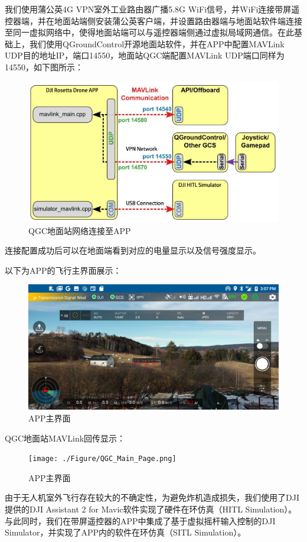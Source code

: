 我们使用蒲公英4G VPN室外工业路由器广播5.8G WiFi信号，并WiFi连接带屏遥控器端，并在地面站端侧安装蒲公英客户端，并设置路由器端与地面站软件端连接至同一虚拟网络中，使得地面站端可以与遥控器端侧通过虚拟局域网通信。在此基础上，我们使用QGroundControl开源地面站软件，并在APP中配置MAVLink UDP目的地址IP，端口14550，地面站QGC端配置MAVLink UDP端口同样为14550，如下图所示：

\begin{figure}[ht]
  \centering
  \includegraphics[width=0.8\linewidth]{./Figure/QGC_Connect_to_APP.png}
  \caption{QGC地面站网络连接至APP}\label{Fig:xd1}
\end{figure}

连接配置成功后可以在地面端看到对应的电量显示以及信号强度显示。

以下为APP的飞行主界面展示：

\begin{figure}[ht]
  \centering
  \includegraphics[width=0.8\linewidth]{./Figure/APP_Main_Page.png}
  \caption{APP主界面}\label{Fig:xd1}
\end{figure}

QGC地面站MAVLink回传显示：

\begin{figure}[ht]
  \centering
  \texttt{[image: ./Figure/QGC\_Main\_Page.png]}
  \caption{APP主界面}\label{Fig:xd1}
\end{figure}

由于无人机室外飞行存在较大的不确定性，为避免炸机造成损失，我们使用了DJI提供的DJI Assistant 2 for Mavic软件实现了硬件在环仿真（HITL Simulation）。与此同时，我们在带屏遥控器的APP中集成了基于虚拟摇杆输入控制的DJI Simulator，并实现了APP内的软件在环仿真（SITL Simulation）。

